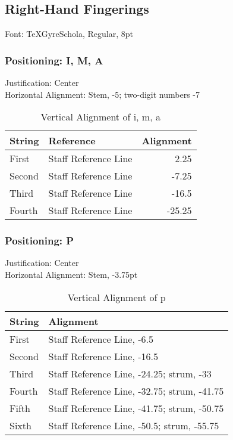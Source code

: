 \documentclass[10pt,twoside]{article} %
\begin{document}
\subsection{Right-Hand Fingerings}
\label{sec:right-hand-fing}

Font: TeXGyreSchola, Regular, 8pt\\

\subsubsection{Positioning: I, M, A}
\label{sec:positioning:-i-m}

Justification: Center\\
Horizontal Alignment: Stem, -5; two-digit numbers -7\\

\begin{table}[h!]
  \centering
  \begin{tabular}{l l r}
    String & Reference & Alignment\\\hline
    First & Staff Reference Line & 2.25\\
    Second & Staff Reference Line & -7.25\\
    Third & Staff Reference Line & -16.5\\
    Fourth & Staff Reference Line & -25.25\\
\end{tabular}
\caption{Vertical Alignment of i, m, a}
\end{table}

\subsubsection{Positioning: P}
\label{sec:positioning:-p}

Justification: Center\\
Horizontal Alignment: Stem, -3.75pt\\

\begin{table}[h!]
  \centering
  \begin{tabular}{l l}
    String & Alignment\\\hline
    First & Staff Reference Line, -6.5\\
    Second & Staff Reference Line, -16.5\\
    Third & Staff Reference Line, -24.25; strum, -33\\
    Fourth & Staff Reference Line, -32.75; strum, -41.75\\
    Fifth & Staff Reference Line, -41.75; strum, -50.75\\
    Sixth & Staff Reference Line, -50.5; strum, -55.75\\
  \end{tabular}
  \caption{Vertical Alignment of p}
  \label{tab:p}
\end{table}
\end{document}
